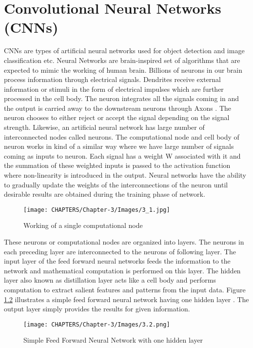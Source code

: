 \chapter{Convolutional Neural Networks (CNNs)}
\label{Chapter 3}

CNNs are types of artificial neural networks used 
for object detection and image classification etc. Neural Networks 
are brain-inspired set of algorithms that are expected to mimic the working 
of human brain. Billions of neurons in our brain process information through 
electrical signals. Dendrites receive external information or stimuli in the form of electrical impulses which are further processed in the cell body. The neuron integrates all the signals coming in and the output is carried away to the downstream neurons through Axons \cite{chap_3_article:1}. The neuron chooses to either reject or accept the signal depending on the signal strength. Likewise, an artificial neural network has large  number of interconnected nodes called neurons. The computational node and cell body of neuron works in kind of a similar way where we have large number of signals coming as inputs to neuron. Each signal has a weight W associated with it and the 
summation of these weighted inputs is passed to the activation function where 
 non-linearity is introduced in the output. Neural networks have the ability to gradually 
update the weights of the interconnections of the neuron until desirable results 
are obtained during the training phase of network.

\begin{figure}[H]
	\centering
		\texttt{[image: CHAPTERS/Chapter-3/Images/3\_1.jpg]}
	\caption{Working of a single computational node}
	\label{fig:3.1}
\end{figure}

These neurons or computational nodes are organized 
into layers. The neurons in each preceding layer are interconnected to the neurons of following layer. The input layer of the feed forward neural 
networks feeds the information to the network and mathematical 
computation is performed on this layer. The hidden layer also known as distillation layer 
acts like a cell body and performs computation to extract salient features and 
patterns from the input data. Figure \ref{fig:3.2} illustrates a simple 
feed forward neural network having one 
hidden layer \cite{chap_3_article:2}.
The output layer simply provides the results for given information. 

\begin{figure}[H]
	\centering
		\texttt{[image: CHAPTERS/Chapter-3/Images/3.2.png]}
	\caption{Simple Feed Forward Neural Network with one hidden layer}
	\label{fig:3.2}
\end{figure}

